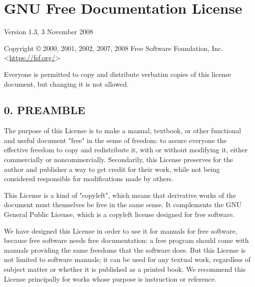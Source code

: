\chapter{GNU Free Documentation License}
Version 1.3, 3 November 2008\par
Copyright © 2000, 2001, 2002, 2007, 2008 Free Software Foundation, Inc. <\url{https://fsf.org/}> \par
Everyone is permitted to copy and distribute verbatim copies of this license document, but changing it is not allowed.
\section{0. PREAMBLE}
The purpose of this License is to make a manual, textbook, or other functional and useful document "free" in the sense of freedom: to assure everyone the effective freedom to copy and redistribute it, with or without modifying it, either commercially or noncommercially. Secondarily, this License preserves for the author and publisher a way to get credit for their work, while not being considered responsible for modifications made by others.\par
This License is a kind of "copyleft", which means that derivative works of the document must themselves be free in the same sense. It complements the GNU General Public License, which is a copyleft license designed for free software.\par
We have designed this License in order to use it for manuals for free software, because free software needs free documentation: a free program should come with manuals providing the same freedoms that the software does. But this License is not limited to software manuals; it can be used for any textual work, regardless of subject matter or whether it is published as a printed book. We recommend this License principally for works whose purpose is instruction or reference.
